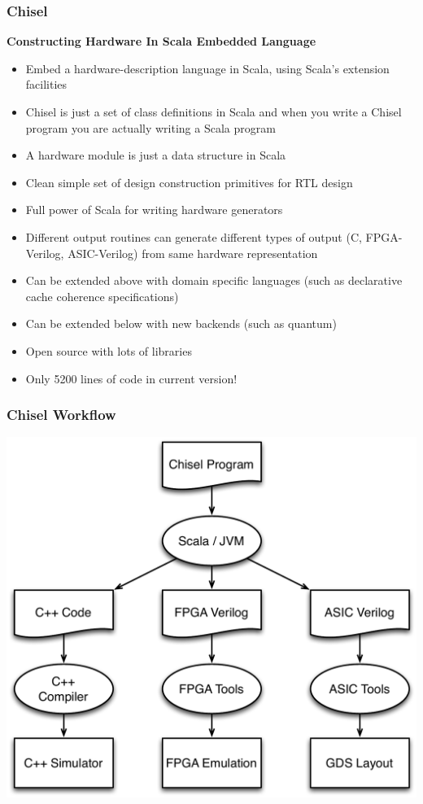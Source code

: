 \documentclass[xcolor=pdflatex,dvipsnames,table]{beamer}
\begin{document}
\begin{frame}

\frametitle{Chisel}

\textbf{Constructing Hardware In Scala Embedded Language}
\begin{itemize}
\item Embed a hardware-description language in Scala, using Scala's extension facilities
\item Chisel is just a set of class definitions in Scala and when you write a Chisel program you are actually writing a Scala program
\item A hardware module is just a data structure in Scala
\item Clean simple set of design construction primitives for RTL design
\item Full power of Scala for writing hardware generators
\item Different output routines can generate different types of output (C, FPGA-Verilog, ASIC-Verilog) from same hardware representation
\item Can be extended above with domain specific languages (such as declarative cache coherence specifications)
\item Can be extended below with new backends (such as quantum)
\item Open source with lots of libraries
\item Only 5200 lines of code in current version!
\end{itemize}

\end{frame}

\begin{frame}
\frametitle{Chisel Workflow}
\begin{center}
\includegraphics[height=0.9\textheight]{figs/workflow.pdf}
\end{center}

\end{frame}
\end{document}
